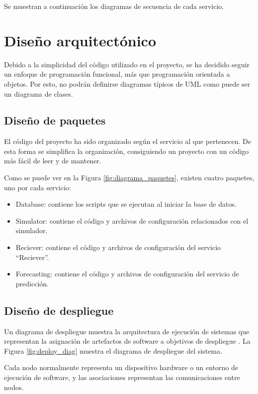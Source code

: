 Se muestran a continuación los diagramas de secuencia de cada servicio.



\section{Diseño arquitectónico}

Debido a la simplicidad del código utilizado en el proyecto, se ha decidido seguir un enfoque de programación 
funcional, más que programación orientada a objetos. Por esto, no podrán definirse diagramas típicos de UML como 
puede ser un diagrama de clases.

\subsection{Diseño de paquetes}

El código del proyecto ha sido organizado según el servicio al que pertenecen. De esta forma se simplifica la organización,
consiguiendo un proyecto con un código más fácil de leer y de mantener.


Como se puede ver en la Figura \ref{fig:diagrama_paquetes}, existen cuatro paquetes, uno por cada servicio:
\begin{itemize}
    \item Database: contiene los scripts que se ejecutan al iniciar la base de datos.
    \item Simulator: contiene el código y archivos de configuración relacionados con el simulador.
    \item Reciever: contiene el código y archivos de configuración del servicio ``Reciever''.
    \item Forecasting: contiene el código y archivos de configuración del servicio de predicción.
\end{itemize}

\subsection{Diseño de despliegue}

Un diagrama de despliegue muestra la arquitectura de ejecución de sistemas que representan la asignación
de artefactos de software a objetivos de despliegue \cite{uml:deploy}. La Figura \ref{fig:deploy_diag} muestra el 
diagrama de despliegue del sistema.

Cada nodo normalmente representa un dispositivo hardware o un entorno de ejecución de software, y las asociaciones 
representan las comunicaciones entre nodos.


